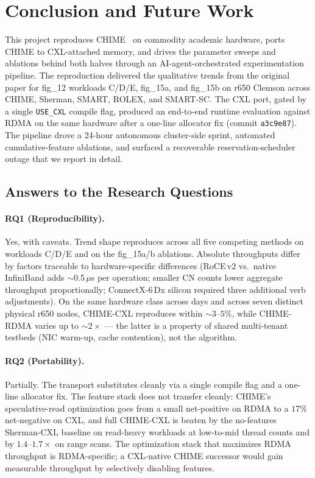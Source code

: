 \documentclass[11pt,a4paper]{article}
\begin{document}
\section{Conclusion and Future Work}
\label{sec:conclusion}

This project reproduces CHIME~\cite{chime2024} on commodity academic hardware, ports CHIME to CXL-attached memory, and drives the parameter sweeps and ablations behind both halves through an AI-agent-orchestrated experimentation pipeline. The reproduction delivered the qualitative trends from the original paper for fig\_12 workloads C/D/E, fig\_15a, and fig\_15b on r650 Clemson across CHIME, Sherman, SMART, ROLEX, and SMART-SC. The CXL port, gated by a single \texttt{USE\_CXL} compile flag, produced an end-to-end runtime evaluation against RDMA on the same hardware after a one-line allocator fix (commit \texttt{a3c9e87}). The pipeline drove a 24-hour autonomous cluster-side sprint, automated cumulative-feature ablations, and surfaced a recoverable reservation-scheduler outage that we report in detail.

\subsection{Answers to the Research Questions}
\label{sec:answers}

\paragraph{RQ1 (Reproducibility).} Yes, with caveats. Trend shape reproduces across all five competing methods on workloads C/D/E and on the fig\_15a/b ablations. Absolute throughputs differ by factors traceable to hardware-specific differences (RoCE\,v2 vs.\ native InfiniBand adds $\sim$0.5\,$\mu$s per operation; smaller CN counts lower aggregate throughput proportionally; ConnectX-6\,Dx silicon required three additional verb adjustments). On the same hardware class across days and across seven distinct physical r650 nodes, CHIME-CXL reproduces within $\sim 3$--$5\%$, while CHIME-RDMA varies up to $\sim 2\times$ --- the latter is a property of shared multi-tenant testbeds (NIC warm-up, cache contention), not the algorithm.

\paragraph{RQ2 (Portability).} Partially. The transport substitutes cleanly via a single compile flag and a one-line allocator fix. The feature stack does not transfer cleanly: CHIME's speculative-read optimization goes from a small net-positive on RDMA to a $17\%$ net-negative on CXL, and full CHIME-CXL is beaten by the no-features Sherman-CXL baseline on read-heavy workloads at low-to-mid thread counts and by $1.4$--$1.7\times$ on range scans. The optimization stack that maximizes RDMA throughput is RDMA-specific; a CXL-native CHIME successor would gain measurable throughput by selectively disabling features.
\end{document}
